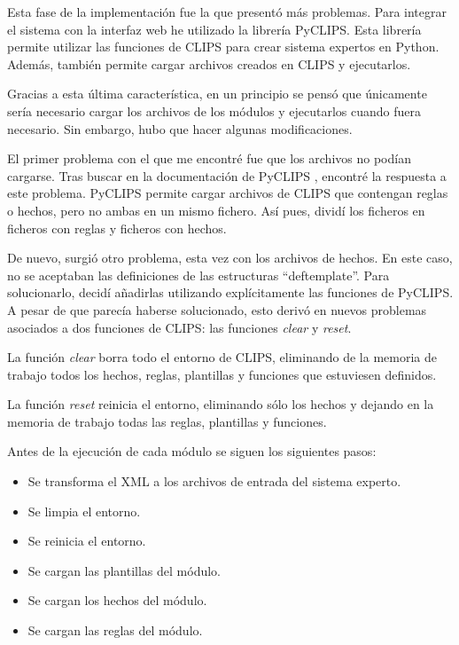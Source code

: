 Esta fase de la implementación fue la que presentó más problemas. Para integrar el sistema con la interfaz web he utilizado la librería PyCLIPS. Esta librería permite utilizar las funciones de CLIPS para crear sistema expertos en Python. Además, también permite cargar archivos creados en CLIPS y ejecutarlos.

Gracias a esta última característica, en un principio se pensó que únicamente sería necesario cargar los archivos de los módulos y  ejecutarlos cuando fuera necesario. Sin embargo, hubo que hacer algunas modificaciones.

El primer problema con el que me encontré fue que los archivos no podían cargarse. Tras buscar en la documentación de PyCLIPS \cite{PYCLIPS}, encontré la respuesta a este problema. PyCLIPS permite cargar archivos de CLIPS que contengan reglas o hechos, pero no ambas en un mismo fichero. Así pues, dividí los ficheros en ficheros con reglas y ficheros con hechos. 

De nuevo, surgió otro problema, esta vez con los archivos de hechos. En este caso, no se aceptaban las definiciones de las estructuras ``deftemplate''. Para solucionarlo, decidí añadirlas utilizando explícitamente las funciones de PyCLIPS. A pesar de que parecía haberse solucionado, esto derivó en nuevos problemas asociados a dos funciones de CLIPS: las funciones \textit{clear} y \textit{reset}.

\bigskip
La función \textit{clear} borra todo el entorno de CLIPS, eliminando de la memoria de trabajo todos los hechos, reglas, plantillas y funciones que estuviesen definidos.

\bigskip
La función \textit{reset} reinicia el entorno, eliminando sólo los hechos y dejando en la memoria de trabajo todas las reglas, plantillas y funciones.

Antes de la ejecución de cada módulo se siguen los siguientes pasos:

\begin{itemize}
	\item Se transforma el XML a los archivos de entrada del sistema experto.
	\item Se limpia el entorno.
	\item Se reinicia el entorno.
	\item Se cargan las plantillas del módulo.
	\item Se cargan los hechos del módulo.
	\item Se cargan las reglas del módulo.
\end{itemize}

